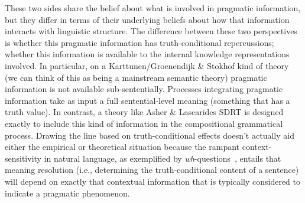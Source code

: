 \documentclass[12pt,letterpaper,table,svgnames,dvipsnames]{article}
\newcommand{\whq}{\emph{wh}-question~}
\newcommand{\whqs}{\emph{wh}-questions~}
\begin{document}
These two sides share the belief about what is involved in pragmatic information, but they differ in terms of their underlying beliefs about how that information interacts with linguistic structure. The difference between these two perspectives is whether this pragmatic information has truth-conditional repercussions; whether this information is available to the internal knowledge representations involved. In particular, on a Karttunen/Groenendijk \& Stokhof kind of theory (we can think of this as being a mainstream semantic theory) pragmatic information is not available sub-sententially. Processes integrating pragmatic information take as input a full sentential-level meaning (something that has a truth value). %
In contrast, a theory like Asher \& Lascarides SDRT is designed exactly to include this kind of information in the compositional grammatical process. Drawing the line based on truth-conditional effects doesn't actually aid either the empirical or theoretical situation because the rampant context-sensitivity in natural language, as exemplified by \whqs, entails that meaning resolution (i.e., determining the truth-conditional content of a sentence) will depend on exactly that contextual information that is typically considered to indicate a pragmatic phenomenon.


\end{document}
